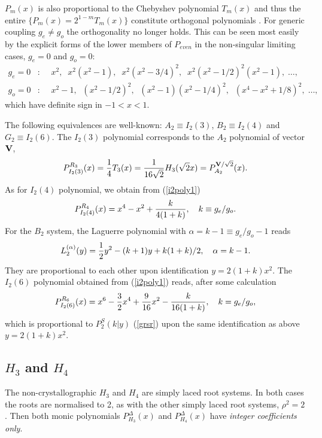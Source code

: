 \documentclass[a4paper,12pt]{article}
\begin{document}
$P_m(x)$ is also proportional to the Chebyshev polynomial $T_m(x)$ and thus the
entire $\{P_m(x)=2^{1-m}T_m(x)\}$ constitute orthogonal polynomials \cite{cs}.
For generic coupling $g_e\neq g_o$ the orthogonality no longer holds.
This can be seen most easily by the explicit forms of the lower members
of $P_{even}$ in the non-singular limiting cases, $g_e=0$ and $g_o=0$:
\begin{eqnarray}
   g_e=0&:&\;\; x^2,\;\; x^2(x^2-1),\;\; x^2(x^2-3/4)^2,
   \;\; x^2(x^2-1/2)^2(x^2-1),\;\ldots,\nonumber\\
   g_o=0&:&\;\; x^2-1,\;\; (x^2-1/2)^2,\;\; (x^2-1)(x^2-1/4)^2,\;\; 
   (x^4-x^2+1/8)^2,\;\ldots,
\end{eqnarray}
which have definite sign in $-1<x<1$.

The following equivalences are well-known: $A_2\equiv I_2(3)$,
$B_2\equiv I_2(4)$ and $G_2\equiv I_2(6)$. The $I_2(3)$ polynomial
corresponds to the $A_2$ polynomial of vector ${\bf V}$,
\begin{equation}
   P_{I_2(3)}^{R_3}(x)=\frac14T_3(x)
   =\frac{1}{16\sqrt{2}}H_3(\sqrt{2}x)=P_{A_2}^{{\bf V}/\sqrt{2}}(x).
\end{equation}
As for $I_2(4)$ polynomial, we obtain from (\ref{i2poly1})
\begin{equation}
   P_{I_2(4)}^{R_4}(x)=x^4-x^2 +{k\over{4(1+k)}},\quad k\equiv g_e/g_o.
\end{equation}
For the $B_2$ system,
the Laguerre polynomial with $\alpha=k-1\equiv g_e/g_o-1$ reads
\[
   L_2^{(\alpha)}(y)={1\over2}y^2-(k+1)y+{k(1+k)/2},\quad \alpha=k-1.
\]
They are proportional to each other upon identification $y=2(1+k)x^2$.
The $I_2(6)$ polynomial obtained from (\ref{i2poly1}) reads,
after some calculation
\begin{equation}
   P_{I_2(6)}^{R_6}(x)=x^6-{3\over2}x^4+{9\over{16}}x^2-
   {k\over{16(1+k)}},\quad k=g_e/g_o,
\end{equation}
which is proportional to $P_{2}^{S}(k|y)$ (\ref{grsr}) upon the same
identification as above $y=2(1+k)x^2$.

\subsection{$H_3$ and $H_4$}

The non-crystallographic $H_3$ and $H_4$ are  simply laced root systems.
In both cases the roots are normalised to 2, as with the other simply
laced root systems, $\rho^2=2$.
Then both monic  polynomials $P_{H_3}^{\Delta}(x)$ and
$P_{H_4}^{\Delta}(x)$ have {\em integer coefficients only\/}.
\end{document}
